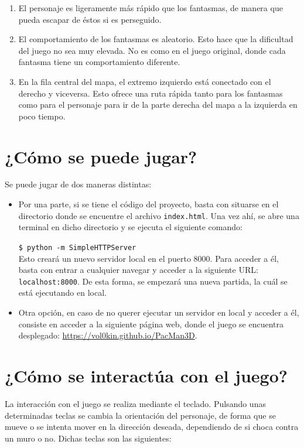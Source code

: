 \documentclass[11pt,a4paper]{article}
\newcommand{\shellcmd}[1]{\indent\indent\texttt{\footnotesize\$ #1}\\}
\begin{document}
\begin{enumerate}
	\item El personaje es ligeramente más rápido que los fantasmas, de manera que pueda
	escapar de éstos si es perseguido.
	\item El comportamiento de los fantasmas es aleatorio. Esto hace que la dificultad del
	juego no sea muy elevada. No es como en el juego original, donde cada fantasma tiene un
	comportamiento diferente.
	\item En la fila central del mapa, el extremo izquierdo está conectado con el derecho y
	viceversa. Esto ofrece una ruta rápida tanto para los fantasmas como para el personaje para
	ir de la parte derecha del mapa a la izquierda en poco tiempo.
\end{enumerate}

\section{¿Cómo se puede jugar?}

Se puede jugar de dos maneras distintas:

\begin{itemize}[label=\textbullet]
	\item Por una parte, si se tiene el código del proyecto, basta con situarse en el directorio
	donde se encuentre el archivo \texttt{index.html}. Una vez ahí, se abre una terminal en dicho
	directorio y se ejecuta el siguiente comando:
	
	\shellcmd{python -m SimpleHTTPServer}
	
	Esto creará un nuevo servidor local en el puerto 8000. Para acceder a él, basta con
	entrar a cualquier navegar y acceder a la siguiente URL: \texttt{localhost:8000}. De
	esta forma, se empezará una nueva partida, la cuál se está ejecutando en local.
	\item Otra opción, en caso de no querer ejecutar un servidor en local y acceder a él, consiste
	en acceder a la siguiente página web, donde el juego se encuentra desplegado:
	\url{https://vol0kin.github.io/PacMan3D}.	
\end{itemize}

\section{¿Cómo se interactúa con el juego?}

La interacción con el juego se realiza mediante el teclado. Pulsando unas determinadas teclas
se cambia la orientación del personaje, de forma que se mueve o se intenta mover en la dirección
deseada, dependiendo de si choca contra un muro o no. Dichas teclas son las siguientes:
\end{document}
